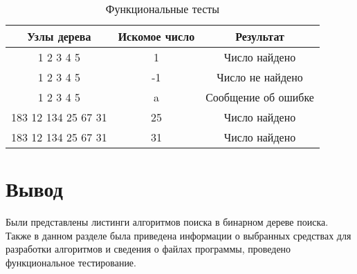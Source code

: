 \begin{table}[ht]
	\small
	\begin{center}
		\begin{threeparttable}
		\caption{Функциональные тесты}
		\label{tbl:func_tests}
		\begin{tabular}{|c|c|c|}
			\hline
			\bfseries Узлы дерева & \bfseries Искомое число & \bfseries Результат\\
			\hline
			1 2 3 4 5 & 1 & Число найдено\\
			\hline
			1 2 3 4 5 & -1 & Число не найдено \\
			\hline
			1 2 3 4 5 & a & Сообщение об ошибке\\
			\hline
			183 12 134 25 67 31 & 25 & Число найдено \\
			\hline
			183 12 134 25 67 31 & 31 & Число найдено \\
			\hline
		\end{tabular}
		\end{threeparttable}
	\end{center}
\end{table}


\section*{Вывод}

Были представлены листинги алгоритмов поиска в бинарном дереве поиска.
Также в данном разделе была приведена информации о выбранных средствах для разработки алгоритмов и сведения о файлах программы, проведено функциональное тестирование.
